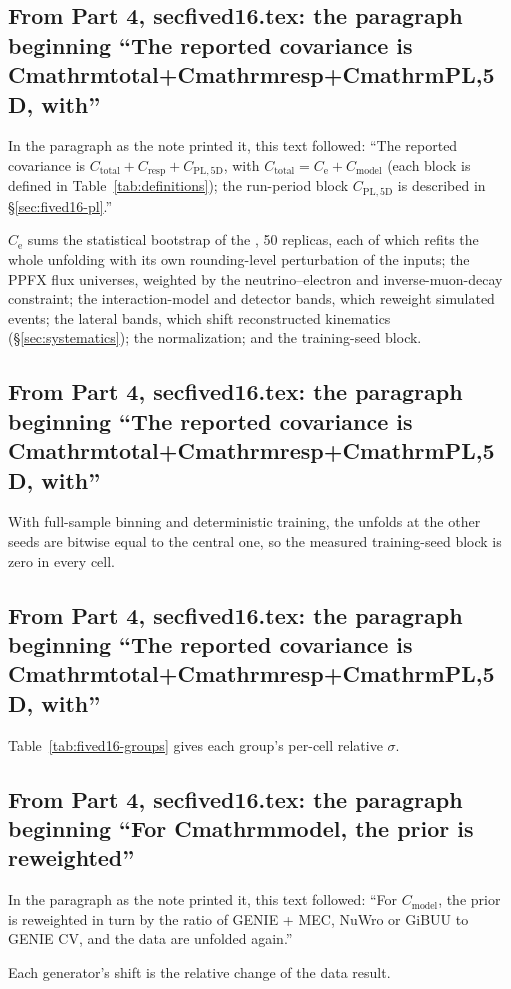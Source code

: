 \subsection{From Part 4, secfived16.tex: the paragraph beginning ``The reported covariance is Cmathrmtotal+Cmathrmresp+CmathrmPL,5D, with''}
In the paragraph as the note printed it, this text followed: ``The reported covariance is $C_{\mathrm{total}}+C_{\mathrm{resp}}+C_{\mathrm{PL,5D}}$, with $C_{\mathrm{total}}=C_{\mathrm{e}}+C_{\mathrm{model}}$ (each block is defined in Table~\ref{tab:definitions}); the run-period block $C_{\mathrm{PL,5D}}$ is described in \S\ref{sec:fived16-pl}.''\par
$C_{\mathrm{e}}$ sums the statistical bootstrap of the \estMultiD{}, 50 replicas, each of which refits the whole unfolding with its own rounding-level perturbation of the inputs; the PPFX flux universes, weighted by the neutrino--electron and inverse-muon-decay constraint; the interaction-model and detector bands, which reweight simulated events; the lateral bands, which shift reconstructed kinematics (\S\ref{sec:systematics}); the normalization; and the training-seed block.

\subsection{From Part 4, secfived16.tex: the paragraph beginning ``The reported covariance is Cmathrmtotal+Cmathrmresp+CmathrmPL,5D, with''}
With full-sample binning and deterministic training, the unfolds at the other seeds are bitwise equal to the central one, so the measured training-seed block is zero in every cell.

\subsection{From Part 4, secfived16.tex: the paragraph beginning ``The reported covariance is Cmathrmtotal+Cmathrmresp+CmathrmPL,5D, with''}
Table~\ref{tab:fived16-groups} gives each group's per-cell relative $\sigma$.

\subsection{From Part 4, secfived16.tex: the paragraph beginning ``For Cmathrmmodel, the prior is reweighted''}
In the paragraph as the note printed it, this text followed: ``For $C_{\mathrm{model}}$, the prior is reweighted in turn by the ratio of GENIE + MEC, NuWro or GiBUU to GENIE CV, and the data are unfolded again.''\par
Each generator's shift is the relative change of the data result.

